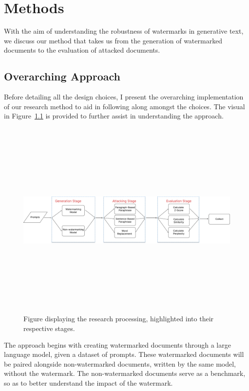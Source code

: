 \documentclass{l4proj}
\theoremstyle{definition}
\begin{document}
    
\chapter{Methods}
\label{chap:method}

With the aim of understanding the robustness of watermarks in generative text, we discuss our method that takes us from the generation of watermarked documents to the evaluation of attacked documents.

\section{Overarching Approach}
    Before detailing all the design choices, I present the overarching implementation of our research method to aid in following along amongst the choices. The visual in Figure~\ref{fig:method-flow-chart} is provided to further assist in understanding the approach.

    \begin{figure}[ht]
        \centering
         \includegraphics[height=10cm, width=1\linewidth, keepaspectratio]{images/methods/research-process.pdf}
        \caption{Figure displaying the research processing, highlighted into their respective stages.}
        \label{fig:method-flow-chart} 
    \end{figure}
    
    The approach begins with creating watermarked documents through a large language model, given a dataset of prompts. These watermarked documents will be paired alongside non-watermarked documents, written by the same model, without the watermark. The non-watermarked documents serve as a benchmark, so as to better understand the impact of the watermark.
\end{document}
